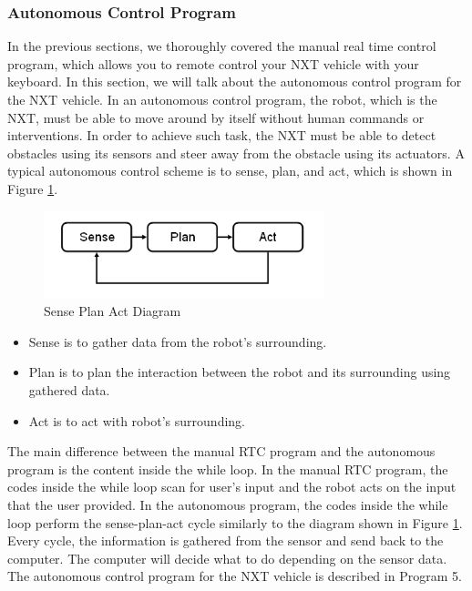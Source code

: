 \subsubsection{Autonomous Control Program}
In the previous sections, we thoroughly covered the manual real time control program, which allows you to 
remote control your NXT vehicle with your keyboard.
In this section, we will talk about the autonomous control program for the NXT vehicle.
In an autonomous control program, the robot, which is the NXT, must be able to move around by itself without
human commands or interventions. In order to achieve such task, the NXT must be able to detect obstacles using 
its sensors and steer away from the obstacle using its actuators.
A typical autonomous control scheme is to sense, plan, and act, which is shown in Figure \ref{fig_NXT_SPA}.
\begin{figure}[h]
  \begin{center}
    \includegraphics[height=1in]{figure/mindstorm/Senseplanact.png}
    \caption{Sense Plan Act Diagram \label{fig_NXT_SPA}}
  \end{center}
\end{figure}
\begin{itemize}
\item Sense is to gather data from the robot's surrounding.
\item Plan is to plan the interaction between the robot and its surrounding using gathered data.
\item Act is to act with robot's surrounding.
\end{itemize}
The main difference between the manual RTC program and the autonomous program is the content inside the while loop.
In the manual RTC program, the codes inside the while loop scan for user's input and the robot acts on the input that
the user provided. In the autonomous program, the codes inside the while loop perform the sense-plan-act cycle similarly 
to the diagram shown in Figure \ref{fig_NXT_SPA}.
Every cycle, the information is gathered from the sensor and send back to the computer.
The computer will decide what to do depending on the sensor data.
The autonomous control program for the NXT vehicle is described in Program 5.
